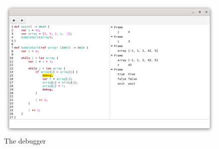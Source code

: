 \documentclass[11pt, american, draft]{PhdThesis}
\begin{document}
  \begin{figure}[H]
    \center
    \includegraphics[width=0.9\linewidth]{5.png}
    \caption{The debugger}
    \label{ex8}
  \end{figure}


  \backmatter





  \backmatter

  
  

\end{document}
